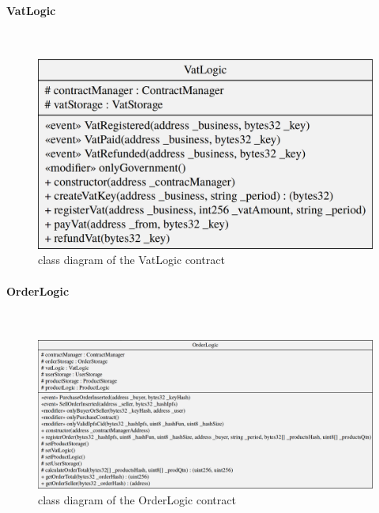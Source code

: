 \paragraph{VatLogic}\mbox{}\\
\begin{figure}[H]
	\centering
	\includegraphics[scale=0.20]{res/images/solidity/vatlogic.png}
	\caption{class diagram of the VatLogic contract}
\end{figure}

\paragraph{OrderLogic}\mbox{}\\
\begin{figure}[H]
	\centering
	\includegraphics[scale=0.25]{res/images/solidity/orderlogic.png}
	\caption{class diagram of the OrderLogic contract}
\end{figure}